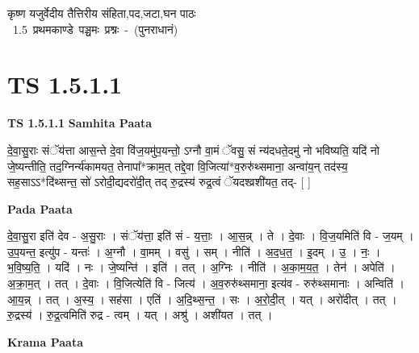 \documentclass[17pt]{extarticle}
\begin{document}
\begin{titlepage}
    \begin{center}
 
\begin{sanskrit}
    { \Huge
    कृष्ण यजुर्वेदीय तैत्तिरीय संहिता,पद,जटा,घन पाठः 
    }
    \\
    \vspace{2.5cm}
    \mbox{ \Huge
    1.5     प्रथमकाण्डे पञ्चमः प्रश्नः - (पुनराधानं)   }
\end{sanskrit}
\end{center}

\end{titlepage}
\tableofcontents
\pagebreak

\section*{ TS 1.5.1.1 }

\textbf{TS 1.5.1.1 } \newline
\textbf{Samhita Paata} \newline

दे॒वा॒सु॒राः संॅय॑त्ता आस॒न्ते दे॒वा वि॑ज॒यमु॑प॒यन्तो॒ ऽग्नौ वा॒मं ॅवसु॒ सं न्य॑दधते॒दमु॑ नो भविष्यति॒ यदि॑ नो जे॒ष्यन्तीति॒ तद॒ग्निर्न्य॑कामयत॒ तेनापा᳚*क्राम॒त् तद्दे॒वा वि॒जित्या॑*व॒रुरु॑थ्समाना॒ अन्वा॑य॒न् तद॑स्य॒ सह॒साऽऽ*दि॑थ्सन्त॒ सो॑ ऽरोदी॒द्यदरो॑दी॒त् तद् रु॒द्रस्य॑ रुद्र॒त्वं ॅयदश्व्रशी॑यत॒ तद्- [ ] \newline

\textbf{Pada Paata} \newline

दे॒वा॒सु॒रा इति॑ देव - अ॒सु॒राः । संॅय॑त्ता॒ इति॑ सं - य॒त्ताः॒ । आ॒स॒न्न् । ते । दे॒वाः । वि॒ज॒यमिति॑ वि - ज॒यम् । उ॒प॒यन्त॒ इत्यु॑प - यन्तः॑ । अ॒ग्नौ । वा॒मम् । वसु॑ । सम् । नीति॑ । अ॒द॒ध॒त॒ । इ॒दम् । उ॒ । नः॒ । भ॒वि॒ष्य॒ति॒ । यदि॑ । नः । जे॒ष्यन्ति॑ । इति॑ । तत् । अ॒ग्निः । नीति॑ । अ॒का॒म॒य॒त॒ । तेन॑ । अपेति॑ । अ॒क्रा॒म॒त् । तत् । दे॒वाः । वि॒जित्येति॑ वि - जित्य॑ । अ॒व॒रुरु॑थ्समाना॒ इत्य॑व - रुरु॑थ्समानाः । अन्विति॑ । आ॒य॒न्न् । तत् । अ॒स्य॒ । सह॑सा । एति॑ । अ॒दि॒थ्स॒न्त॒ । सः । अ॒रो॒दी॒त् । यत् । अरो॑दीत् । तत् । रु॒द्रस्य॑ । रु॒द्र॒त्वमिति॑ रुद्र - त्वम् । यत् । अश्रु॑ । अशी॑यत । तत् ।  \newline


\textbf{Krama Paata} \newline
\end{document}
